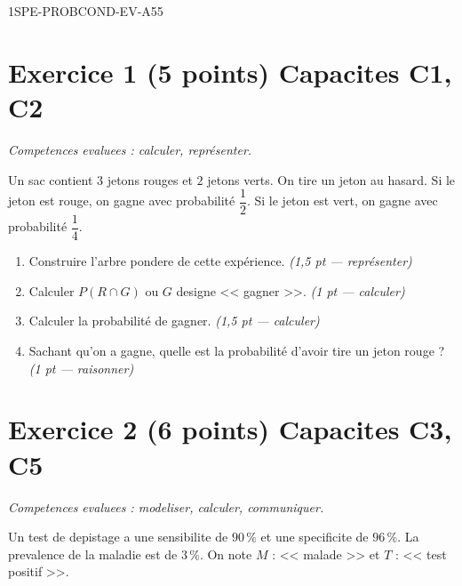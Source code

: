 
\begin{evaluation}{1SPE-PROBCOND-EV-A}{55}

\section*{Exercice 1 \hfill (5 points) \hfill Capacites C1, C2}

\textit{Competences evaluees : calculer, représenter.}

\medskip
Un sac contient $3$ jetons rouges et $2$ jetons verts. On tire un jeton au hasard. Si le jeton est rouge, on gagne avec probabilité $\dfrac{1}{2}$. Si le jeton est vert, on gagne avec probabilité $\dfrac{1}{4}$.

\begin{enumerate}
  \item Construire l'arbre pondere de cette expérience.
  \hfill\textit{(1,5 pt --- représenter)}

  \item Calculer $P(R \cap G)$ ou $G$ designe << gagner >>.
  \hfill\textit{(1 pt --- calculer)}

  \item Calculer la probabilité de gagner.
  \hfill\textit{(1,5 pt --- calculer)}

  \item Sachant qu'on a gagne, quelle est la probabilité d'avoir tire un jeton rouge ?
  \hfill\textit{(1 pt --- raisonner)}
\end{enumerate}

\section*{Exercice 2 \hfill (6 points) \hfill Capacites C3, C5}

\textit{Competences evaluees : modeliser, calculer, communiquer.}

\medskip
Un test de depistage a une sensibilite de $90\,\%$ et une specificite de $96\,\%$. La prevalence de la maladie est de $3\,\%$. On note $M$ : << malade >> et $T$ : << test positif >>.


\end{evaluation}

